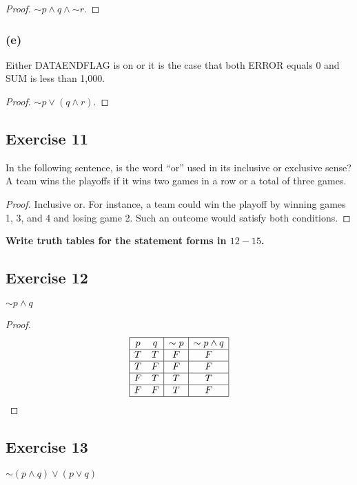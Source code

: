 \documentclass[14pt]{extarticle}
\begin{document}
\begin{proof}
    ${\sim p} \wedge q \wedge {\sim r}$.
\end{proof}

\subsubsection{(e)}
Either DATAENDFLAG is on or it is the case that both ERROR equals 0 and SUM is less than 1,000.

\begin{proof}
    ${\sim p} \vee (q \wedge r)$.
\end{proof}

\subsection{Exercise 11}
In the following sentence, is the word ``or'' used in its inclusive or exclusive sense? A team wins the playoffs if it wins two games in a row or a total of three games.

\begin{proof}
    Inclusive or. For instance, a team could win the playoff by winning games 1, 3, and 4 and losing game 2. Such an outcome would satisfy both conditions.
\end{proof}

{\bf Write truth tables for the statement forms in $12-15$.}

\subsection{Exercise 12}
${\sim p} \wedge q$

\begin{proof}
    $$
        \begin{array}{|cc|c|c|}
            \hline p & q & {\sim p} & {\sim p} \wedge q \\
            \hline T & T & F        & F                 \\
            \hline T & F & F        & F                 \\
            \hline F & T & T        & T                 \\
            \hline F & F & T        & F                 \\
            \hline\end{array}
    $$
\end{proof}

\subsection{Exercise 13}
${\sim(p \wedge q)} \vee (p \vee q)$
\end{document}
